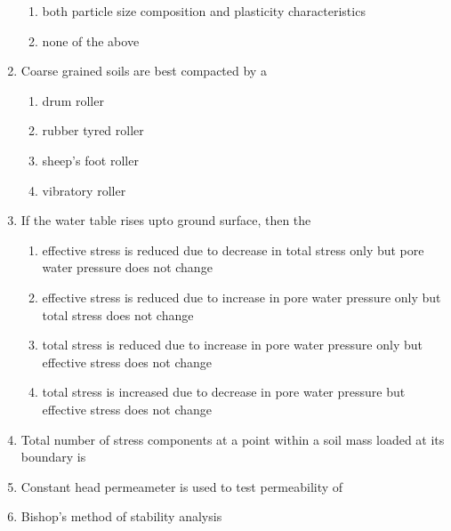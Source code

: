 \documentclass[11pt,a4paper]{article}
\begin{document}
\begin{enumerate}
\begin{enumerate}[label=\Alph*.]
\item{both particle size composition and plasticity characteristics}
\item{none of the above}
\end{enumerate}
\item{Coarse grained soils are best compacted by a}
\begin{enumerate}[label=\Alph*.]
\item{drum roller}
\item{rubber tyred roller}
\item{sheep's foot roller}
\item{vibratory roller}
\end{enumerate}
\item{If the water table rises upto ground surface, then the}
\begin{enumerate}[label=\Alph*.]
\item{effective stress is reduced due to decrease in total stress only but pore water pressure does not change}
\item{effective stress is reduced due to increase in pore water pressure only but total stress does not change}
\item{total stress is reduced due to increase in pore water pressure only but effective stress does not change}
\item{total stress is increased due to decrease in pore water pressure but effective stress does not change}
\end{enumerate}
\item{Total number of stress components at a point within a soil mass loaded at its boundary is}
\\
\item{Constant head permeameter is used to test permeability of}
\\
\item{Bishop's method of stability analysis
}
\end{enumerate}
\end{document}
